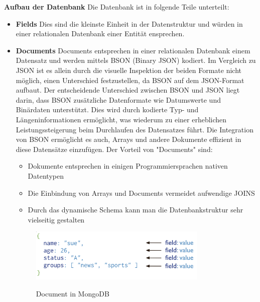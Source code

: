 \textbf{Aufbau der Datenbank}
\newline
Die Datenbank ist in folgende Teile unterteilt:

\begin{itemize}
    \item \textbf{Fields}
        \newline
        Dies sind die kleinste Einheit in der Datenstruktur und würden in einer relationalen Datenbank einer Entität ensprechen.
    \item \textbf{Documents}
        \newline
        Documents entsprechen in einer relationalen Datenbank einem Datensatz und werden mittels BSON (Binary JSON) kodiert. Im Vergleich zu JSON ist es allein durch die visuelle Inspektion der beiden Formate nicht möglich, einen Unterschied festzustellen, da BSON auf dem JSON-Format aufbaut.
        \newline
        Der entscheidende Unterschied zwischen BSON und JSON liegt darin, dass BSON zusätzliche Datenformate wie Datumswerte und Binärdaten unterstützt. Dies wird durch kodierte Typ- und Längeninformationen ermöglicht, was wiederum zu einer erheblichen Leistungssteigerung beim Durchlaufen des Datensatzes führt. Die Integration von BSON ermöglicht es auch, Arrays und andere Dokumente effizient in diese Datensätze einzufügen.
        \newline
        Der Vorteil von "Documents" sind:
        \begin{itemize}
            \item Dokumente entsprechen in einigen Programmiersprachen nativen Datentypen
            \item Die Einbindung von Arrays und Documents vermeidet aufwendige JOINS
            \item Durch das dynamische Schema kann man die Datenbankstruktur sehr vielseitig gestalten
        \end{itemize}
        \begin{figure}[h!]
            \centering
            \includegraphics[width=0.8\textwidth]{pics/document.png}
            \caption{Document in MongoDB}
            \cite{mongodb_document}
            \label{fig:enter-label}

\end{figure}
\end{itemize}
